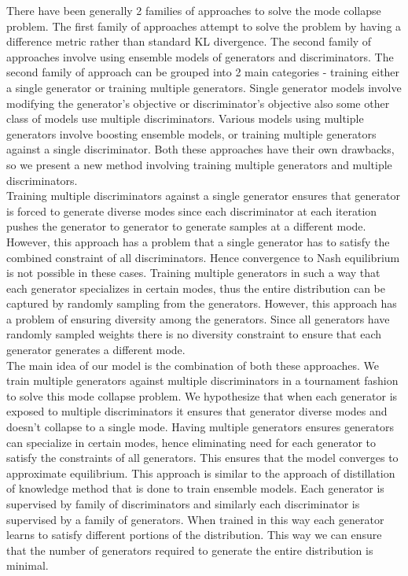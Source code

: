 \documentclass[12pt]{article}
\begin{document}
There have been generally 2 families of approaches to solve the mode collapse problem. The first family of approaches attempt to solve the problem by having a difference metric rather than standard KL divergence. The second family of approaches involve using ensemble models of generators and discriminators. The second family of approach can be grouped into 2 main categories - training either a single generator or training multiple generators. Single generator models involve modifying the generator’s objective or discriminator’s objective also some other class of models use multiple discriminators. Various models using multiple generators involve boosting ensemble models, or training multiple generators against a single discriminator. Both these approaches have their own drawbacks, so we present a new method involving training multiple generators and multiple discriminators. \\

Training multiple discriminators against a single generator ensures that generator is forced to generate diverse modes since each discriminator at each iteration pushes the generator to generator to generate samples at a different mode. However, this approach has a problem that a single generator has to satisfy the combined constraint of all discriminators. Hence convergence to Nash equilibrium is not possible in these cases. Training multiple generators in such a way that each generator specializes in certain modes, thus the entire distribution can be captured by randomly sampling from the generators. However, this approach has a problem of ensuring diversity among the generators. Since all generators have randomly sampled weights there is no diversity constraint to ensure that each generator generates a different mode.\\

The main idea of our model is the combination of both these approaches. We train multiple generators against multiple discriminators in a tournament fashion to solve this mode collapse problem. We hypothesize that when each generator is exposed to multiple discriminators it ensures that generator diverse modes and doesn’t collapse to a single mode. Having multiple generators ensures generators can specialize in certain modes, hence eliminating need for each generator to satisfy the constraints of all generators. This ensures that the model converges to approximate equilibrium. This approach is similar to the approach of distillation of knowledge method that is done to train ensemble models. Each generator is supervised by family of discriminators and similarly each discriminator is supervised by a family of generators. When trained in this way each generator learns to satisfy different portions of the distribution.  This way we can ensure that the number of generators required to generate the entire distribution is minimal.\\
\end{document}

